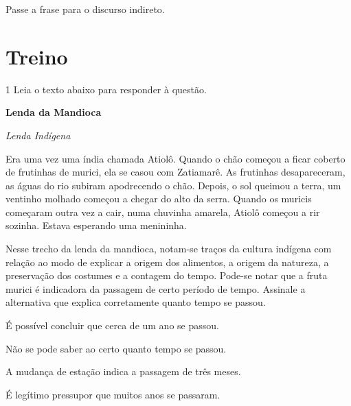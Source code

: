 Passe a frase para o discurso indireto.


\section*{Treino}

\num{1} Leia o texto abaixo para responder à questão.

\begin{myquote}

\textbf{Lenda da Mandioca}

\emph{Lenda Indígena}

Era uma vez uma índia chamada Atiolô. Quando o chão começou a ficar
coberto de frutinhas de murici, ela se casou com Zatiamarê. As frutinhas
desapareceram, as águas do rio subiram apodrecendo o chão. Depois, o sol
queimou a terra, um ventinho molhado começou a chegar do alto da serra.
Quando os muricis começaram outra vez a cair, numa chuvinha amarela,
Atiolô começou a rir sozinha. Estava esperando uma menininha.


\end{myquote}

Nesse trecho da lenda da mandioca, notam-se traços da cultura
indígena com relação ao modo de explicar a origem dos alimentos, a
origem da natureza, a preservação dos costumes e a contagem do tempo.
Pode-se notar que a fruta murici é indicadora da passagem de certo 
período de tempo. Assinale a alternativa que explica corretamente 
quanto tempo se passou.

\begin{escolha}

  \item É possível concluir que cerca de um ano se passou.
  
  \item Não se pode saber ao certo quanto tempo se passou.
  
  \item A mudança de estação indica a passagem de três meses.  
  
  \item É legítimo pressupor que muitos anos se passaram. 

\end{escolha}

